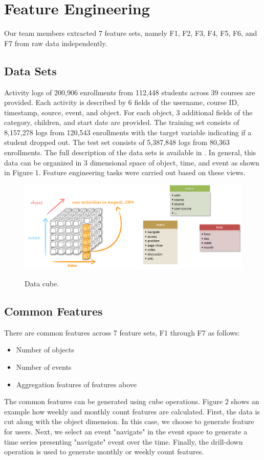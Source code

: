 \section{Feature Engineering}
Our team members extracted 7 feature sets, namely F1, F2, F3, F4, F5, F6, and F7 from raw data independently.

\subsection{Data Sets}
Activity logs of 200,906 enrollments from 112,448 students across 39 courses are provided.
Each activity is described by 6 fields of the username, course ID, timestamp, source, event, and object. 
For each object, 3 additional fields of the category, children, and start date are provided.
The training set consists of 8,157,278 logs from 120,543 enrollments with the target variable indicating if a student dropped out.  
The test set consists of 5,387,848 logs from 80,363 enrollments.
The full description of the data sets is available in \cite{kddcup2015_data}. In general, this data can be organized in 3 dimensional space of object, time, and event as shown in Figure 1. Feature engineering tasks were carried out based on these views.

\begin{figure}[!t]
	\centering
	\includegraphics[width=0.5 \textwidth]{cube}
	\label{fig:cube}
	\caption{Data cube.}
\end{figure}


\subsection{Common Features}
There are common features across 7 feature sets, F1 through F7 as follows:
\begin{itemize}
	\item Number of objects
	\item Number of events
	\item Aggregation features of features above
\end{itemize}

The common features can be generated using cube operations. Figure 2 shows an example how weekly and monthly count features are calculated. First, the data is cut along with the object dimension. In this case, we choose to generate feature for users. Next, we select an event "navigate" in the event space to generate a time series presenting "navigate" event over the time. Finally, the drill-down operation is used to generate monthly or weekly count features.

